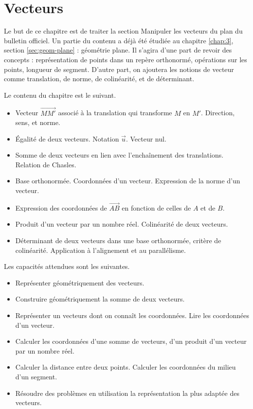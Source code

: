 
\chapter{Vecteurs}

Le but de ce chapitre est de traiter la section \og Manipuler les vecteurs du plan \fg du bulletin officiel.
Un partie du contenu a déjà été étudiée au chapitre \ref{chap:3}, section \ref{sec:geom-plane} : géométrie plane.
Il s'agira d'une part de revoir des concepts : représentation de points dans un repère orthonormé, opérations sur les points, longueur de segment.
D'autre part, on ajoutera les notions de vecteur comme translation, de norme, de colinéarité, et de déterminant.

Le contenu du chapitre est le suivant.
	\begin{itemize}
		\item
			Vecteur $\vec{MM'}$ associé à la translation qui transforme $M$ en $M'$. Direction, sens, et norme.
		\item
			Égalité de deux vecteurs. Notation $\vec{u}$. Vecteur nul.
		\item
			Somme de deux vecteurs en lien avec l'enchaînement des translations. Relation de Chasles.
		\item
			Base orthonormée. Coordonnées d'un vecteur. Expression de la norme d'un vecteur.
		\item
			Expression des coordonnées de $\vec{AB}$ en fonction de celles de $A$ et de $B$.
		\item
			Produit d'un vecteur par un nombre réel. Colinéarité de deux vecteurs.
		\item
			Déterminant de deux vecteurs dans une base orthonormée, critère de colinéarité.
			Application à l'alignement et au parallélisme.
	\end{itemize}

Les capacités attendues sont les suivantes.
	\begin{itemize}
		\item 
			Représenter géométriquement des vecteurs.
		\item
			Construire géométriquement la somme de deux vecteurs.
		\item
			Représenter un vecteurs dont on connaît les coordonnées.
			Lire les coordonnées d'un vecteur.
		\item
			Calculer les coordonnées d'une somme de vecteurs, d'un produit d'un vecteur par un nombre réel.
		\item
			Calculer la distance entre deux points. Calculer les coordonnées du milieu d'un segment.
		\item
			Résoudre des problèmes en utilisation la représentation la plus adaptée des vecteurs.
	\end{itemize}
	
